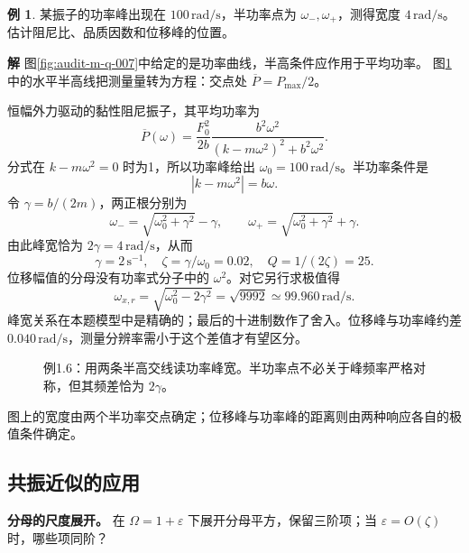 \documentclass[11pt,openany,fontset=fandol]{ctexbook}
\theoremstyle{plain}\newtheorem{theorem}{定理}[chapter]\newtheorem{proposition}[theorem]{命题}
\theoremstyle{definition}\newtheorem{definition}{定义}[chapter]\newtheorem{example}{例}[chapter]
\theoremstyle{remark}\newtheorem*{remark}{说明}
\newcommand{\SolutionStart}{\par\nobreak\medskip\nobreak\noindent\textbf{解}\quad\ignorespaces}
\newenvironment{solution}{\SolutionStart}{\par\medskip}
\begin{document}
\begin{example}
某振子的功率峰出现在 $100\,\mathrm{rad/s}$，半功率点为 $\omega_-,\omega_+$，测得宽度 $4\,\mathrm{rad/s}$。估计阻尼比、品质因数和位移峰的位置。
\end{example}

\begin{solution}
图\ref{fig:audit-m-q-007}中给定的是功率曲线，半高条件应作用于平均功率。
图\ref{fig:eg-1-6}中的水平半高线把测量量转为方程：交点处 $\overline P=P_{\max}/2$。

恒幅外力驱动的黏性阻尼振子，其平均功率为
\[
\overline P(\omega)=\frac{F_0^2}{2b}
\frac{b^2\omega^2}{(k-m\omega^2)^2+b^2\omega^2}.
\]
分式在 $k-m\omega^2=0$ 时为1，所以功率峰给出 $\omega_0=100\,\mathrm{rad/s}$。半功率条件是
\[
|k-m\omega^2|=b\omega.
\]
令 $\gamma=b/(2m)$，两正根分别为
\[
\omega_-=\sqrt{\omega_0^2+\gamma^2}-\gamma,
\qquad \omega_+=\sqrt{\omega_0^2+\gamma^2}+\gamma.
\]
由此峰宽恰为 $2\gamma=4\,\mathrm{rad/s}$，从而
\[
\gamma=2\,\mathrm{s^{-1}},\quad
\zeta=\gamma/\omega_0=0.02,\quad Q=1/(2\zeta)=25.
\]
位移幅值的分母没有功率式分子中的 $\omega^2$。对它另行求极值得
\[
\omega_{x,r}=\sqrt{\omega_0^2-2\gamma^2}
=\sqrt{9992}\simeq99.960\,\mathrm{rad/s}.
\]
峰宽关系在本题模型中是精确的；最后的十进制数作了舍入。位移峰与功率峰约差 $0.040\,\mathrm{rad/s}$，测量分辨率需小于这个差值才有望区分。

\begin{figure}[H]\centering
{}
\caption{例1.6：用两条半高交线读功率峰宽。半功率点不必关于峰频率严格对称，但其频差恰为 $2\gamma$。}\label{fig:eg-1-6}
\end{figure}

图上的宽度由两个半功率交点确定；位移峰与功率峰的距离则由两种响应各自的极值条件确定。
\end{solution}

\subsection{共振近似的应用}
\textbf{分母的尺度展开。} 在 $\Omega=1+\varepsilon$ 下展开分母平方，保留三阶项；当 $\varepsilon=O(\zeta)$ 时，哪些项同阶？
\end{document}
